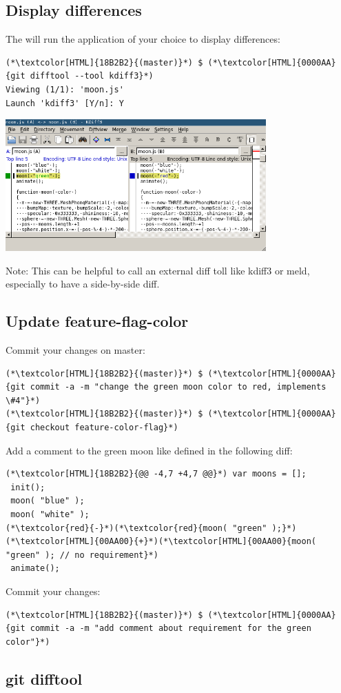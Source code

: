 \subsection{Display differences}
\begin{frame}[fragile]
    \subslidetitle
  The  will run the application of your choice to display differences:
  \begin{lstlisting}
(*\textcolor[HTML]{18B2B2}{(master)}*) $ (*\textcolor[HTML]{0000AA}{git difftool --tool kdiff3}*)
Viewing (1/1): 'moon.js'
Launch 'kdiff3' [Y/n]: Y
\end{lstlisting}

  \vspace{1em}
  \centerline{\includegraphics[width=10cm]{../screen/git-difftool-kdiff3.png}}

  Note: This can be helpful to call an external diff toll like kdiff3 or meld, especially to have a side-by-side diff.

\end{frame}


\subsection{Update feature-flag-color}
\begin{frame}[fragile]
    \subslidetitle
  Commit your changes on master:
\begin{lstlisting}
(*\textcolor[HTML]{18B2B2}{(master)}*) $ (*\textcolor[HTML]{0000AA}{git commit -a -m "change the green moon color to red, implements \#4"}*)
(*\textcolor[HTML]{18B2B2}{(master)}*) $ (*\textcolor[HTML]{0000AA}{git checkout feature-color-flag}*)
\end{lstlisting}

  Add a comment to the green moon like defined in the following diff:
  \begin{lstlisting}
(*\textcolor[HTML]{18B2B2}{@@ -4,7 +4,7 @@}*) var moons = [];
 init();
 moon( "blue" );
 moon( "white" );
(*\textcolor{red}{-}*)(*\textcolor{red}{moon( "green" );}*)
(*\textcolor[HTML]{00AA00}{+}*)(*\textcolor[HTML]{00AA00}{moon( "green" ); // no requirement}*)
 animate();
\end{lstlisting}

  Commit your changes:
  \begin{lstlisting}
(*\textcolor[HTML]{18B2B2}{(master)}*) $ (*\textcolor[HTML]{0000AA}{git commit -a -m "add comment about requirement for the green color"}*)
\end{lstlisting}
\end{frame}
\begin{frame}[fragile]
    \subslidetitle
\end{frame}

\subsection{git difftool}
\begin{frame}[fragile]
    \subslidetitle
\end{frame}

